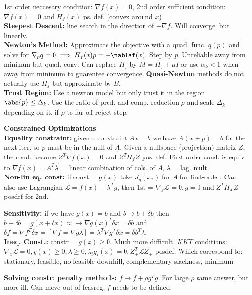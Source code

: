 
\linespread{1.2} %

1st order neccesary condition: $\nabla f(x) =0$, 2nd order sufficient condition: $\nabla f(x) = 0$ and $H_f(x)$ ps. def. (convex around $x$)
\\{\bf Steepest Descent:} line search in the direction of $-\nabla f$. Will converge, but linearly.
\\{\bf Newton's Method:} Approximate the objective with a quad. func. $q(p)$ and solve for $\nabla_p q  = 0 \implies H_f(x)p = -\nablaf(x)$. Step by $p$. Unreliable away from minimun but quad. conv.
Can replace $H_f$ by $M = H_f+\mu I$ or use $\alpha_k < 1$ when away from minimum to guarentee convergence. {\bf Quasi-Newton} methods do not actually use $H_f$ but approximate by $B$.
\\{\bf Trust Region:} Use a newton model but only trust it in the region $\abs{p} \leq \Delta_k$. Use the ratio of pred. and comp. reduction $\rho$ and scale $\Delta_k$ depending on it. if $\rho$ to far off reject step.
\par {\bf Constrained Optimizations}
\\{\bf Equality constraint:} given a constraint $Ax = b$ we have $A(x+p) =b$ for the next iter. so $p$ must be in the null of $A$. Given a nullspace (projection) matrix $Z$, the cond. become $Z^T\nabla f(x) = 0$ and $Z^TH_fZ$ pos. def.
First order cond. is equiv to $\nabla f(x) = A^T\vec \lambda$ = linear combination of cols. of $A$, $\lambda$ = lag. mult.
\\{\bf Non-lin eq. const:} if const = $g(x)$ take $J_g(x_*)$ for $A$ for first-order. Can also use Lagrangian $\mathcal{L} = f(x)-\lambda^Tg$, then 1st = $\nabla_x\mathcal{L} = 0, g = 0$ and $Z^TH_\mathcal{L}Z$ posdef for 2nd.
\par{\bf Sensitivity:} if we have $g(x) = b$ and $b \to b + \delta b$ then $b + \delta b = g(x+\delta x) \approx\to \nabla g(x)^T\delta x = \delta b$ and $\delta f = \nabla f^T \delta x = [\nabla f = \nabla g \lambda] = \lambda^T\nabla g^T \delta x = \delta b ^T \lambda$.
\\{\bf Ineq. Const.:} constr = $g(x) \geq 0$. Much more difficult. $KKT$ conditions: $\nabla_x\mathcal{L} = 0, g(x) \geq 0, \lambda \geq 0, \lambda_ig_i(x) = 0, Z_+^T\mathcal{L}Z_+$ posdef. Which correspond to: stationary, feasible, no feasible downhill, complementary slackness, minimum.
\par{\bf Solving constr: penalty methods: }$f\to f + \rho g^Tg$. For large $\rho$ same answer, but more ill. Can move out of feasreg, $f$ needs to be defined.
